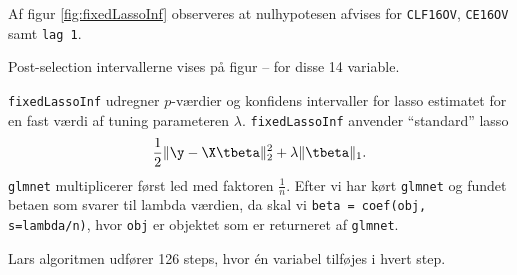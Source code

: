 Af figur \ref{fig:fixedLassoInf} observeres at nulhypotesen afvises for \texttt{CLF16OV}, \texttt{CE16OV} samt \texttt{lag 1}.
%

%


Post-selection intervallerne vises på figur -- for disse 14 variable.


\texttt{fixedLassoInf} udregner \(p\)-værdier og konfidens intervaller for lasso estimatet for en fast værdi af tuning parameteren \(\lambda\).
\texttt{fixedLassoInf} anvender ``standard'' lasso
\begin{align*}
\frac{1}{2} \Vert \y - \X \tbeta \Vert_2^2 + \lambda \Vert \tbeta \Vert_1.
\end{align*}
\texttt{glmnet} multiplicerer først led med faktoren \(\frac{1}{n}\).
Efter vi har kørt \texttt{glmnet} og fundet betaen som svarer til lambda værdien, da skal vi \texttt{beta = coef(obj, s=lambda/n)}, hvor \texttt{obj} er objektet som er returneret af \texttt{glmnet}.



Lars algoritmen udfører 126 steps, hvor én variabel tilføjes i hvert step.
%

%